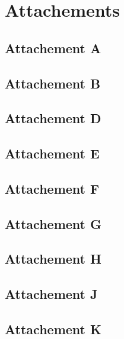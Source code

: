 \section{Attachements}
\subsection{Attachement A}

\subsection{Attachement B}

\subsection{Attachement D}

\subsection{Attachement E}

\subsection{Attachement F}

\subsection{Attachement G}

\subsection{Attachement H}

\subsection{Attachement J}

\subsection{Attachement K}